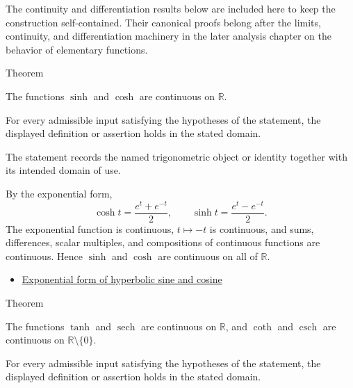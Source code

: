 \begin{remark*}
The continuity and differentiation results below are included here to keep the
construction self-contained. Their canonical proofs belong after the limits,
continuity, and differentiation machinery in the later analysis chapter on the
behavior of elementary functions.
\end{remark*}

\begin{theorembox}{Theorem}
\begin{theorem}
\label{thm:hyperbolic-sinh-cosh-continuous}
The functions $\sinh$ and $\cosh$ are continuous on $\mathbb{R}$.
\end{theorem}
\end{theorembox}
\begin{remark*}
For every admissible input satisfying the hypotheses of the statement, the
displayed definition or assertion holds in the stated domain.
\end{remark*}

\begin{remark*}[Interpretation]
The statement records the named trigonometric object or identity together with
its intended domain of use.
\end{remark*}

\begin{remark*}[Proof]
By the exponential form,
\[
  \cosh t=\frac{e^t+e^{-t}}{2},
  \qquad
  \sinh t=\frac{e^t-e^{-t}}{2}.
\]
The exponential function is continuous, $t\mapsto -t$ is continuous, and sums,
differences, scalar multiples, and compositions of continuous functions are
continuous. Hence $\sinh$ and $\cosh$ are continuous on all of $\mathbb{R}$.
\end{remark*}
\begin{dependencies}
\begin{itemize}
  \item \hyperref[thm:hyperbolic-exponential-form]{Exponential form of hyperbolic sine and cosine}
\end{itemize}
\end{dependencies}

\begin{theorembox}{Theorem}
\begin{theorem}
\label{thm:derived-hyperbolic-functions-continuous}
The functions $\tanh$ and $\operatorname{sech}$ are continuous on
$\mathbb{R}$, and $\operatorname{coth}$ and $\operatorname{csch}$ are
continuous on $\mathbb{R}\setminus\{0\}$.
\end{theorem}
\end{theorembox}
\begin{remark*}
For every admissible input satisfying the hypotheses of the statement, the
displayed definition or assertion holds in the stated domain.
\end{remark*}

